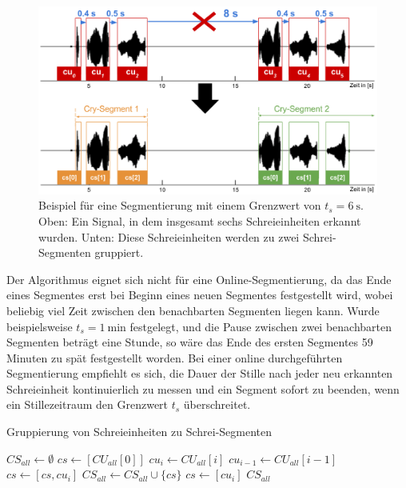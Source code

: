 \begin{figure}[h]
	\centering
	\includegraphics[width=1\textwidth]{bilder/segmentierung09.png}
	\caption[Beispiel für eine Segmentierung]{Beispiel für eine Segmentierung mit einem Grenzwert von $t_s = \SI{6}{\second}$. Oben: Ein Signal, in dem insgesamt sechs Schreieinheiten erkannt wurden. Unten: Diese Schreieinheiten werden zu zwei Schrei-Segmenten gruppiert.}
	\label{img:segmenting06}
\end{figure}

Der Algorithmus eignet sich nicht für eine Online-Segmentierung, da das Ende eines Segmentes erst bei Beginn eines neuen Segmentes festgestellt wird, wobei beliebig viel Zeit zwischen den benachbarten Segmenten liegen kann. Wurde beispielsweise $t_{s} = \SI{1}{\minute}$ festgelegt, und die Pause zwischen zwei benachbarten Segmenten beträgt eine Stunde, so wäre das Ende des ersten Segmentes 59 Minuten zu spät festgestellt worden. Bei einer online durchgeführten Segmentierung empfiehlt es sich, die Dauer der Stille nach jeder neu erkannten Schreieinheit kontinuierlich zu messen und ein Segment sofort zu beenden, wenn ein Stillezeitraum den Grenzwert $t_s$ überschreitet.

\begin{algorithm}[h]
	\caption{Gruppierung von Schreieinheiten zu Schrei-Segmenten}
	\label{alg:crySegment}
	\begin{algorithmic}[1]
		\State $ CS_{all} \gets \emptyset$
		\State $ cs \gets [CU_{all}[0]]$
						\State $ cu_i \gets CU_{all}[i]$
						\State $cu_{i-1} \gets CU_{all}[i-1]$
								\State $cs \gets [cs , cu_i]$
						\Else
								\State $CS_{all} \gets CS_{all} \cup \{cs\}$
								\State $cs \gets [cu_i]$
						\EndIf
				\EndFor
		\Return $CS_{all}$
		
		\EndFunction
		
	\end{algorithmic}
\end{algorithm}


